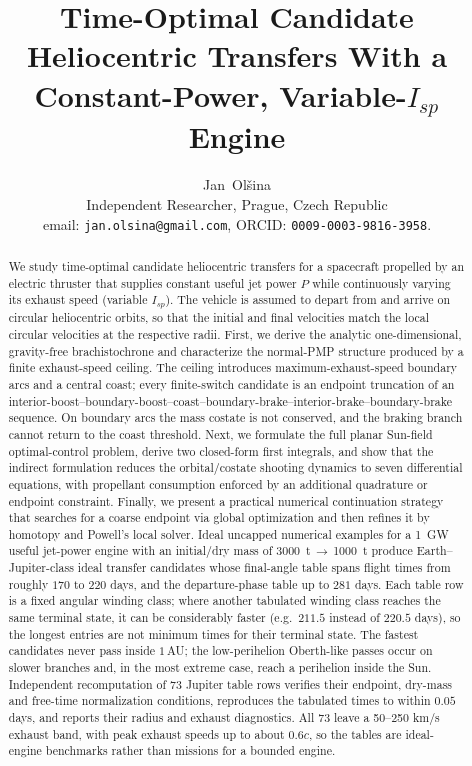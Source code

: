 \documentclass[journal,a4paper]{IEEEtran}
\date{}
\begin{document}
\title{Time-Optimal Candidate Heliocentric Transfers With a Constant-Power, Variable-$I_{\!sp}$ Engine}

\author{Jan~Ol\v{s}ina\\[1ex] Independent Researcher, Prague, Czech Republic\\
email: \texttt{jan.olsina@gmail.com},  ORCID: \texttt{0009-0003-9816-3958}.}


\maketitle

\begin{abstract}
We study time-optimal candidate heliocentric transfers for a spacecraft propelled by an electric thruster that supplies constant useful jet power \(P\) while continuously varying its exhaust speed (variable \(I_{\!sp}\)). The vehicle is assumed to depart from and arrive on circular heliocentric orbits, so that the initial and final velocities match the local circular velocities at the respective radii. First, we derive the analytic one-dimensional, gravity-free brachistochrone and characterize the normal-PMP structure produced by a finite exhaust-speed ceiling. The ceiling introduces maximum-exhaust-speed boundary arcs and a central coast; every finite-switch candidate is an endpoint truncation of an interior-boost--boundary-boost--coast--boundary-brake--interior-brake--boundary-brake sequence. On boundary arcs the mass costate is not conserved, and the braking branch cannot return to the coast threshold. Next, we formulate the full planar Sun-field optimal-control problem, derive two closed-form first integrals, and show that the indirect formulation reduces the orbital/costate shooting dynamics to seven differential equations, with propellant consumption enforced by an additional quadrature or endpoint constraint. Finally, we present a practical numerical continuation strategy that searches for a coarse endpoint via global optimization and then refines it by homotopy and Powell's local solver. Ideal uncapped numerical examples for a \SI{1}{GW} useful jet-power engine with an initial/dry mass of \SI{3000}{t}\,\(\to\)\,\SI{1000}{t} produce Earth--Jupiter-class ideal transfer candidates whose final-angle table spans flight times from roughly \(170\) to \(220\) days, and the departure-phase table up to \(281\) days. Each table row is a fixed angular winding class; where another tabulated winding class reaches the same terminal state, it can be considerably faster (e.g.\ \(211.5\) instead of \(220.5\) days), so the longest entries are not minimum times for their terminal state. The fastest candidates never pass inside \(1\)\,AU; the low-perihelion Oberth-like passes occur on slower branches and, in the most extreme case, reach a perihelion inside the Sun. Independent recomputation of 73 Jupiter table rows verifies their endpoint, dry-mass and free-time normalization conditions, reproduces the tabulated times to within \(0.05\) days, and reports their radius and exhaust diagnostics. All 73 leave a 50--250 km/s exhaust band, with peak exhaust speeds up to about \(0.6c\), so the tables are ideal-engine benchmarks rather than missions for a bounded engine.
\end{abstract}
\end{document}
